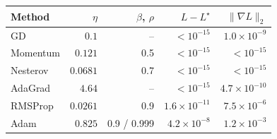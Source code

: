 \begin{tabular}{lrrrr}
\toprule
Method & $\eta$ & $\beta$, $\rho$ & $L-L^\star$ & $\|\nabla L\|_2$ \\
\midrule
GD & $0.1$ & -- & $<10^{-15}$ & $1.0\times10^{-9}$ \\
Momentum & $0.121$ & 0.5 & $<10^{-15}$ & $<10^{-15}$ \\
Nesterov & $0.0681$ & 0.7 & $<10^{-15}$ & $<10^{-15}$ \\
AdaGrad & $4.64$ & -- & $<10^{-15}$ & $4.7\times10^{-10}$ \\
RMSProp & $0.0261$ & 0.9 & $1.6\times10^{-11}$ & $7.5\times10^{-6}$ \\
Adam & $0.825$ & 0.9 / 0.999 & $4.2\times10^{-8}$ & $1.2\times10^{-3}$ \\
\bottomrule
\end{tabular}
